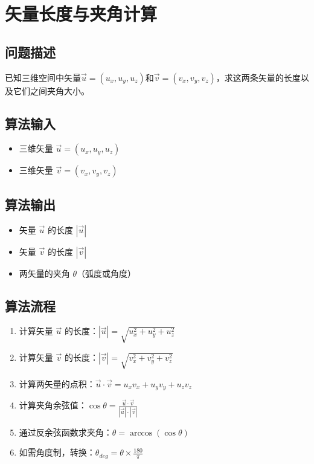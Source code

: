 \documentclass[12pt,a4paper]{article}
\begin{document}
\newpage
\section{矢量长度与夹角计算}

\subsection{问题描述}
已知三维空间中矢量$\vec{u}=(u_x,u_y,u_z)$和$\vec{v}=(v_x,v_y,v_z)$，求这两条矢量的长度以及它们之间夹角大小。

\subsection{算法输入}
\begin{itemize}
    \item 三维矢量 $\vec{u} = (u_x, u_y, u_z)$
    \item 三维矢量 $\vec{v} = (v_x, v_y, v_z)$
\end{itemize}

\subsection{算法输出}
\begin{itemize}
    \item 矢量 $\vec{u}$ 的长度 $|\vec{u}|$
    \item 矢量 $\vec{v}$ 的长度 $|\vec{v}|$
    \item 两矢量的夹角 $\theta$（弧度或角度）
\end{itemize}

\subsection{算法流程}
\begin{enumerate}
    \item 计算矢量 $\vec{u}$ 的长度：$|\vec{u}| = \sqrt{u_x^2 + u_y^2 + u_z^2}$
    \item 计算矢量 $\vec{v}$ 的长度：$|\vec{v}| = \sqrt{v_x^2 + v_y^2 + v_z^2}$
    \item 计算两矢量的点积：$\vec{u} \cdot \vec{v} = u_x v_x + u_y v_y + u_z v_z$
    \item 计算夹角余弦值：$\cos\theta = \frac{\vec{u} \cdot \vec{v}}{|\vec{u}| \cdot |\vec{v}|}$
    \item 通过反余弦函数求夹角：$\theta = \arccos(\cos\theta)$
    \item 如需角度制，转换：$\theta_{deg} = \theta \times \frac{180}{\pi}$
\end{enumerate}
\end{document}
